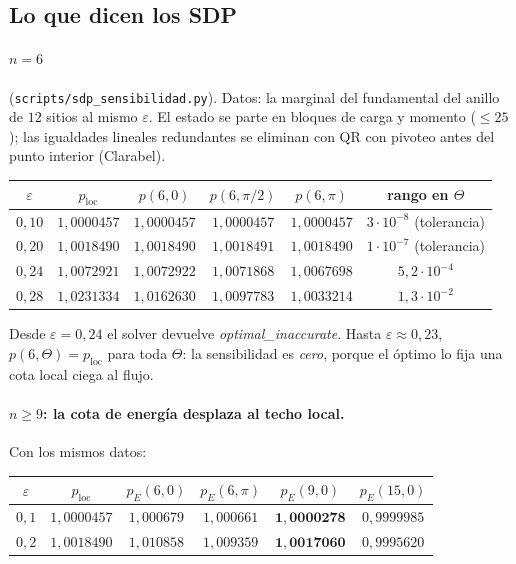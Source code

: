 \documentclass[11pt,a4paper]{article}
\theoremstyle{definition}
\theoremstyle{remark}
\newcommand{\eps}{\varepsilon}
\newcommand{\pE}{p_{E}}
\newcommand{\ploc}{p_{\mathrm{loc}}}
\newcommand{\scr}[1]{\texttt{scripts/#1}}
\begin{document}
\subsection{Lo que dicen los SDP}

\paragraph{$n=6$} (\scr{sdp\_sensibilidad.py}). Datos: la marginal del fundamental del anillo de $12$
sitios al mismo $\eps$. El estado se parte en bloques de carga y momento ($\le25$); las igualdades
lineales redundantes se eliminan con QR con pivoteo antes del punto interior (Clarabel).

\begin{center}
\begin{tabular}{cccccc}
\toprule
$\eps$ & $\ploc$ & $p(6,0)$ & $p(6,\pi/2)$ & $p(6,\pi)$ & rango en $\Theta$\\
\midrule
$0{,}10$ & $1{,}0000457$ & $1{,}0000457$ & $1{,}0000457$ & $1{,}0000457$ & $3\cdot10^{-8}$ (tolerancia)\\
$0{,}20$ & $1{,}0018490$ & $1{,}0018490$ & $1{,}0018491$ & $1{,}0018490$ & $1\cdot10^{-7}$ (tolerancia)\\
$0{,}24$ & $1{,}0072921$ & $1{,}0072922$ & $1{,}0071868$ & $1{,}0067698$ & $5{,}2\cdot10^{-4}$\\
$0{,}28$ & $1{,}0231334$ & $1{,}0162630$ & $1{,}0097783$ & $1{,}0033214$ & $1{,}3\cdot10^{-2}$\\
\bottomrule
\end{tabular}
\end{center}

\noindent
Desde $\eps=0{,}24$ el solver devuelve \emph{optimal\_inaccurate}.
Hasta $\eps\approx0{,}23$, $p(6,\Theta)=\ploc$ para toda $\Theta$: la sensibilidad es \emph{cero}, porque
el óptimo lo fija una cota local ciega al flujo.

\paragraph{$n\ge9$: la cota de energía desplaza al techo local.} Con los mismos datos:

\begin{center}
\begin{tabular}{cccccc}
\toprule
$\eps$ & $\ploc$ & $\pE(6,0)$ & $\pE(6,\pi)$ & $\pE(9,0)$ & $\pE(15,0)$\\
\midrule
$0{,}1$ & $1{,}0000457$ & $1{,}000679$ & $1{,}000661$ & $\mathbf{1{,}0000278}$ & $0{,}9999985$\\
$0{,}2$ & $1{,}0018490$ & $1{,}010858$ & $1{,}009359$ & $\mathbf{1{,}0017060}$ & $0{,}9995620$\\
\bottomrule
\end{tabular}
\end{center}
\end{document}

